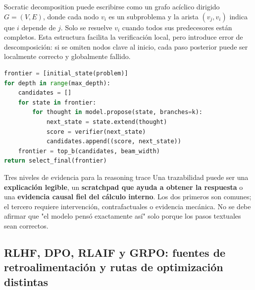Socratic decomposition puede escribirse como un grafo acíclico dirigido $G=(V,E)$, donde cada nodo $v_i$ es un subproblema y la arista $(v_j,v_i)$ indica que $i$ depende de $j$. Solo se resuelve $v_i$ cuando todos sus predecesores están completos. Esta estructura facilita la verificación local, pero introduce error de descomposición: si se omiten nodos clave al inicio, cada paso posterior puede ser localmente correcto y globalmente fallido.




\begin{lstlisting}[language=Python,caption={Pseudocódigo de búsqueda de razonamiento estructurado con verificador}]
frontier = [initial_state(problem)]
for depth in range(max_depth):
    candidates = []
    for state in frontier:
        for thought in model.propose(state, branches=k):
            next_state = state.extend(thought)
            score = verifier(next_state)
            candidates.append((score, next_state))
    frontier = top_b(candidates, beam_width)
return select_final(frontier)
\end{lstlisting}

\begin{warningbox}{Tres niveles de evidencia para la reasoning trace}
Una trazabilidad puede ser una \textbf{explicación legible}, un \textbf{scratchpad que ayuda a obtener la respuesta} o una \textbf{evidencia causal fiel del cálculo interno}. Los dos primeros son comunes; el tercero requiere intervención, contrafactuales o evidencia mecánica. No se debe afirmar que "el modelo pensó exactamente así" solo porque los pasos textuales sean correctos.
\end{warningbox}

\subsection{RLHF, DPO, RLAIF y GRPO: fuentes de retroalimentación y rutas de optimización distintas}

